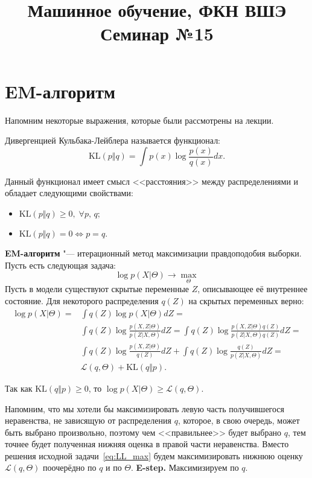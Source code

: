 \documentclass[12pt,a4paper]{article}
\title{Машинное обучение, ФКН ВШЭ\\Семинар №15}
\author{}
\date{}
\begin{document}
\maketitle

\section{EM-алгоритм}
Напомним некоторые выражения, которые были рассмотрены на лекции.

Дивергенцией Кульбака-Лейблера называется функционал:
\begin{equation}
\text{KL}(p\Vert q) = \int p(x)\log \frac{p(x)}{q(x)} dx.
\end{equation}

Данный функционал имеет смысл <<расстояния>> между распределениями и обладает следующими свойствами:
\begin{itemize}
	\item $\text{KL}(p\Vert q) \geq 0, \; \forall p, \,q;$
	\item $\text{KL}(p\Vert q) = 0  \iff p=q.$
\end{itemize}

\textbf{EM-алгоритм} "--- итерационный метод максимизации правдоподобия выборки. Пусть есть следующая задача:
\begin{equation} \label{eq:LL_max}
	\log p(X\vert \Theta) \rightarrow \max_{\Theta}
\end{equation}
Пусть в модели существуют скрытые переменные $Z$, описывающее её внутреннее состояние. Для некоторого распределения $q(Z)$ на скрытых переменных верно:
\begin{align*}
	\log p(X\vert \Theta) = &\int q(Z) \log p(X\vert \Theta) dZ =\\
	 &\int q(Z) \log \frac{p(X,Z\vert \Theta)}{p(Z\vert X, \Theta)} dZ =  \int q(Z) \log \frac{p(X,Z\vert \Theta)q(Z)}{p(Z\vert X, \Theta)q(Z)} dZ = \\
	&\int q(Z)\log \frac{p(X,Z\vert \Theta)}{q(Z)} dZ +\int q(Z) \log \frac{q(Z)}{p(Z\vert X, \Theta)} dZ =\\ & \mathcal{L}(q,\Theta) + \text{KL}(q\Vert p).
\end{align*}

Так как $\text{KL}(q\Vert p) \geq 0$, то $\log p(X\vert \Theta) \geq \mathcal{L}(q,\Theta)$.

Напомним, что мы хотели бы максимизировать левую часть получившегося неравенства, не зависящую от распределения $q$, которое, в свою очередь, может быть выбрано произвольно, поэтому чем <<правильнее>> будет выбрано $q$, тем точнее будет полученная нижняя оценка в правой части неравенства. Вместо решения исходной задачи~\ref{eq:LL_max} будем максимизировать нижнюю оценку $\mathcal{L}(q,\Theta)$ поочерёдно по $q$ и по $\Theta$.
\newpage
\textbf{E-step.} Максимизируем по $q$.
\end{document}
